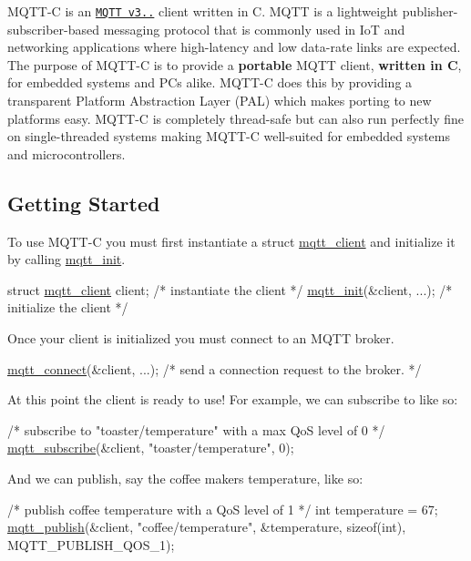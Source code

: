 M\+Q\+T\+T-\/C is an \href{http://docs.oasis-open.org/mqtt/mqtt/v3.1.1/os/mqtt-v3.1.1-os.html}{\tt M\+Q\+TT v3..} client written in C. M\+Q\+TT is a lightweight publisher-\/subscriber-\/based messaging protocol that is commonly used in IoT and networking applications where high-\/latency and low data-\/rate links are expected. The purpose of M\+Q\+T\+T-\/C is to provide a {\bfseries portable} M\+Q\+TT client, {\bfseries written in C}, for embedded systems and PC\textquotesingle{}s alike. M\+Q\+T\+T-\/C does this by providing a transparent Platform Abstraction Layer (P\+AL) which makes porting to new platforms easy. M\+Q\+T\+T-\/C is completely thread-\/safe but can also run perfectly fine on single-\/threaded systems making M\+Q\+T\+T-\/C well-\/suited for embedded systems and microcontrollers.

\subsection*{Getting Started}

To use M\+Q\+T\+T-\/C you must first instantiate a {\ttfamily struct \hyperlink{structmqtt__client}{mqtt\+\_\+client}} and initialize it by calling \hyperlink{group__api_gab07105b049dd86a8ec39c518cf9fa4c7}{mqtt\+\_\+init}. 
\begin{DoxyCode}
\textcolor{keyword}{struct }\hyperlink{structmqtt__client}{mqtt\_client} client; \textcolor{comment}{/* instantiate the client */}
\hyperlink{group__api_gab07105b049dd86a8ec39c518cf9fa4c7}{mqtt\_init}(&client, ...);   \textcolor{comment}{/* initialize the client */}
\end{DoxyCode}
 Once your client is initialized you must connect to an M\+Q\+TT broker. 
\begin{DoxyCode}
\hyperlink{group__api_gadbe914e5a9d4f93314c4e7637cb4f7b3}{mqtt\_connect}(&client, ...); \textcolor{comment}{/* send a connection request to the broker. */}
\end{DoxyCode}
 At this point the client is ready to use! For example, we can subscribe to like so\+: 
\begin{DoxyCode}
\textcolor{comment}{/* subscribe to "toaster/temperature" with a max QoS level of 0 */}
\hyperlink{group__api_gaea5da9b546f6e91eb77c9eff9c478de5}{mqtt\_subscribe}(&client, \textcolor{stringliteral}{"toaster/temperature"}, 0);
\end{DoxyCode}
 And we can publish, say the coffee maker\textquotesingle{}s temperature, like so\+: 
\begin{DoxyCode}
\textcolor{comment}{/* publish coffee temperature with a QoS level of 1 */}
\textcolor{keywordtype}{int} temperature = 67;
\hyperlink{group__api_ga0d8fed24a799ab9b55eeb28f3cd2d0a8}{mqtt\_publish}(&client, \textcolor{stringliteral}{"coffee/temperature"}, &temperature, \textcolor{keyword}{sizeof}(\textcolor{keywordtype}{int}), MQTT\_PUBLISH\_QOS\_1);
\end{DoxyCode}


